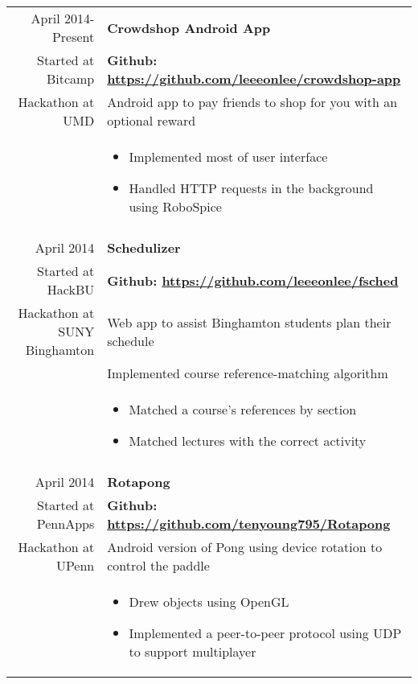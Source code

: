 \documentclass[letterpaper,10pt]{article} %
\begin{document}
\begin{longtable}{r|p{4.5in}}
    April 2014-Present & \textbf{Crowdshop Android App} \\
    Started at Bitcamp & \textbf{Github: \url{https://github.com/leeeonlee/crowdshop-app}} \\
    Hackathon at UMD & Android app to pay friends to shop for you with an optional reward \\
    & \begin{itemize}
        \item Implemented most of user interface
        \item Handled HTTP requests in the background using RoboSpice
    \end{itemize} \\

    \multicolumn{2}{c}{} \\

    April 2014 & \textbf{Schedulizer} \\
    Started at HackBU & \textbf{Github: \url{https://github.com/leeeonlee/fsched}} \\
    Hackathon at SUNY Binghamton & Web app to assist Binghamton students plan their schedule \\
    & Implemented course reference-matching algorithm \\ 
    & \begin{itemize}
        \item Matched a course's references by section
        \item Matched lectures with the correct activity
    \end{itemize} \\

    \multicolumn{2}{c}{} \\

    April 2014 & \textbf{Rotapong} \\
    Started at PennApps  & \textbf{Github: \url{https://github.com/tenyoung795/Rotapong}} \\
    Hackathon at UPenn & Android version of Pong using device rotation to control the paddle \\
    & \begin{itemize}
        \item Drew objects using OpenGL
        \item Implemented a peer-to-peer protocol using UDP to support multiplayer
    \end{itemize}

\end{longtable}
\end{document}
